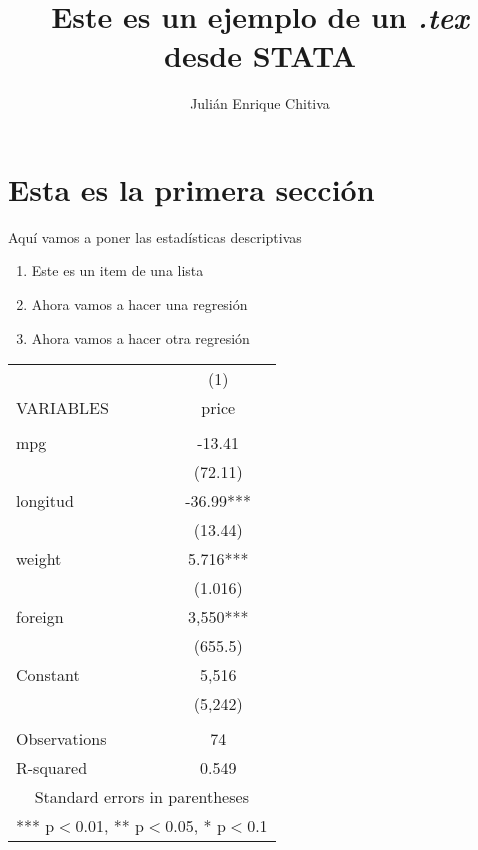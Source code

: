 \documentclass[12pt]{article}
\title{Este es un ejemplo de un \textit{.tex} desde STATA}
\author{Julián Enrique Chitiva}
\begin{document}
\maketitle
\section{Esta es la primera sección}
Aquí vamos a poner las estadísticas descriptivas
\begin{center}
\begin{stlog}\end{stlog}
\end{center}
\begin{enumerate}
\item Este es un item de una lista
\item Ahora vamos a hacer una regresión
\begin{center}
\begin{stlog}\end{stlog}
\end{center}
\item Ahora vamos a hacer otra regresión
\begin{center}
\begin{stlog}\end{stlog}
\end{center}
\end{enumerate}

\begin{tabular}{lc} \hline
 & (1) \\
VARIABLES & price \\ \hline
 &  \\
mpg & -13.41 \\
 & (72.11) \\
longitud & -36.99*** \\
 & (13.44) \\
weight & 5.716*** \\
 & (1.016) \\
foreign & 3,550*** \\
 & (655.5) \\
Constant & 5,516 \\
 & (5,242) \\
 &  \\
Observations & 74 \\
 R-squared & 0.549 \\ \hline
\multicolumn{2}{c}{ Standard errors in parentheses} \\
\multicolumn{2}{c}{ *** p$<$0.01, ** p$<$0.05, * p$<$0.1} \\
\end{tabular}
\end{document}
